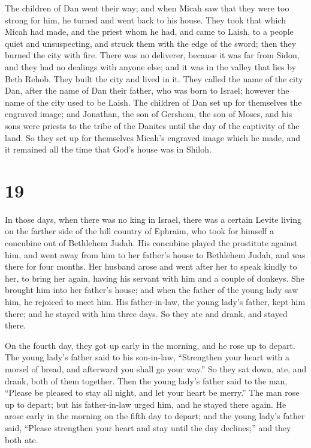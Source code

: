  The children of Dan went their way; and when Micah saw
that they were too strong for him, he turned and went back to his house.
 They took that which Micah had made, and the priest whom
he had, and came to Laish, to a people quiet and unsuspecting, and
struck them with the edge of the sword; then they burned the city with
fire.  There was no deliverer, because it was far from
Sidon, and they had no dealings with anyone else; and it was in the
valley that lies by Beth Rehob. They built the city and lived in it.
 They called the name of the city Dan, after the name of
Dan their father, who was born to Israel; however the name of the city
used to be Laish.  The children of Dan set up for
themselves the engraved image; and Jonathan, the son of Gershom, the son
of Moses, and his sons were priests to the tribe of the Danites until
the day of the captivity of the land.  So they set up for
themselves Micah's engraved image which he made, and it remained all the
time that God's house was in Shiloh.

\hypertarget{section-18}{%
\section{19}\label{section-18}}

 In those days, when there was no king in Israel, there was
a certain Levite living on the farther side of the hill country of
Ephraim, who took for himself a concubine out of Bethlehem Judah.
 His concubine played the prostitute against him, and went
away from him to her father's house to Bethlehem Judah, and was there
for four months.  Her husband arose and went after her to
speak kindly to her, to bring her again, having his servant with him and
a couple of donkeys. She brought him into her father's house; and when
the father of the young lady saw him, he rejoiced to meet him.
 His father-in-law, the young lady's father, kept him there;
and he stayed with him three days. So they ate and drank, and stayed
there.

 On the fourth day, they got up early in the morning, and he
rose up to depart. The young lady's father said to his son-in-law,
``Strengthen your heart with a morsel of bread, and afterward you shall
go your way.''  So they sat down, ate, and drank, both of
them together. Then the young lady's father said to the man, ``Please be
pleased to stay all night, and let your heart be merry.'' 
The man rose up to depart; but his father-in-law urged him, and he
stayed there again.  He arose early in the morning on the
fifth day to depart; and the young lady's father said, ``Please
strengthen your heart and stay until the day declines;'' and they both
ate.

